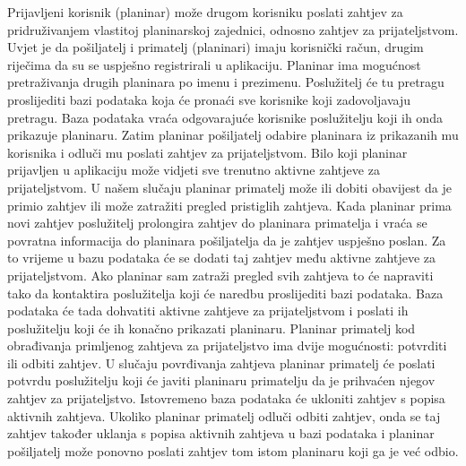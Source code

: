 				Prijavljeni korisnik (planinar) može drugom korisniku poslati zahtjev za pridruživanjem vlastitoj planinarskoj zajednici, odnosno zahtjev za prijateljstvom. Uvjet je da pošiljatelj i primatelj (planinari) imaju korisnički račun, drugim riječima da su se uspješno registrirali u aplikaciju. Planinar ima mogućnost pretraživanja drugih planinara po imenu i prezimenu. Poslužitelj će tu pretragu proslijediti bazi podataka koja će pronaći sve korisnike koji zadovoljavaju pretragu. Baza podataka vraća odgovarajuće korisnike poslužitelju koji ih onda prikazuje planinaru. Zatim planinar pošiljatelj odabire planinara iz prikazanih mu korisnika i odluči mu poslati zahtjev za prijateljstvom. Bilo koji planinar prijavljen u aplikaciju može vidjeti sve trenutno aktivne zahtjeve za prijateljstvom. U našem slučaju planinar primatelj može ili dobiti obavijest da je primio zahtjev ili može zatražiti pregled pristiglih zahtjeva. Kada planinar prima novi zahtjev poslužitelj prolongira zahtjev do planinara primatelja i vraća se povratna informacija do planinara pošiljatelja da je zahtjev uspješno poslan. Za to vrijeme u bazu podataka će se dodati taj zahtjev među aktivne zahtjeve za prijateljstvom. Ako planinar sam zatraži pregled svih zahtjeva to će napraviti tako da kontaktira poslužitelja koji će naredbu proslijediti bazi podataka. Baza podataka će tada dohvatiti aktivne zahtjeve za prijateljstvom i poslati ih poslužitelju koji će ih konačno prikazati planinaru. Planinar primatelj kod obrađivanja primljenog zahtjeva za prijateljstvo ima dvije mogućnosti: potvrditi ili odbiti zahtjev. U slučaju povrđivanja zahtjeva planinar primatelj će poslati potvrdu poslužitelju  koji će javiti planinaru primatelju da je prihvaćen njegov zahtjev za prijateljstvo. Istovremeno baza podataka će ukloniti zahtjev s popisa aktivnih zahtjeva. Ukoliko planinar primatelj odluči odbiti zahtjev, onda se taj zahtjev također uklanja s popisa aktivnih zahtjeva u bazi podataka i planinar pošiljatelj može ponovno poslati zahtjev tom istom planinaru koji ga je već odbio.
				
